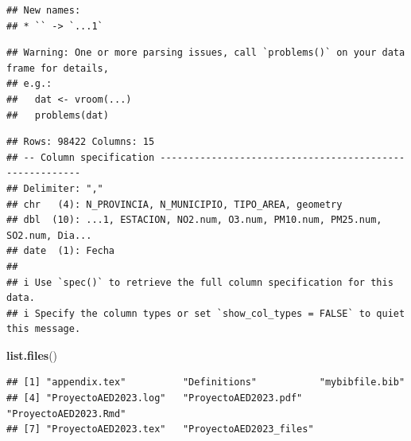 \documentclass[notspecified,article,submit,moreauthors,pdftex]{Definitions/mdpi}
\newenvironment{Shaded}{\begin{snugshade}}{\end{snugshade}}
\newcommand{\FunctionTok}[1]{\textcolor[rgb]{0.13,0.29,0.53}{\textbf{#1}}}
\newcommand{\NormalTok}[1]{#1}
\begin{document}
\begin{verbatim}
## New names:
## * `` -> `...1`
\end{verbatim}

\begin{verbatim}
## Warning: One or more parsing issues, call `problems()` on your data frame for details,
## e.g.:
##   dat <- vroom(...)
##   problems(dat)
\end{verbatim}

\begin{verbatim}
## Rows: 98422 Columns: 15
## -- Column specification --------------------------------------------------------
## Delimiter: ","
## chr   (4): N_PROVINCIA, N_MUNICIPIO, TIPO_AREA, geometry
## dbl  (10): ...1, ESTACION, NO2.num, O3.num, PM10.num, PM25.num, SO2.num, Dia...
## date  (1): Fecha
## 
## i Use `spec()` to retrieve the full column specification for this data.
## i Specify the column types or set `show_col_types = FALSE` to quiet this message.
\end{verbatim}

\begin{Shaded}
\begin{Highlighting}[]
\FunctionTok{list.files}\NormalTok{()}
\end{Highlighting}
\end{Shaded}

\begin{verbatim}
## [1] "appendix.tex"          "Definitions"           "mybibfile.bib"        
## [4] "ProyectoAED2023.log"   "ProyectoAED2023.pdf"   "ProyectoAED2023.Rmd"  
## [7] "ProyectoAED2023.tex"   "ProyectoAED2023_files"
\end{verbatim}
\end{document}
